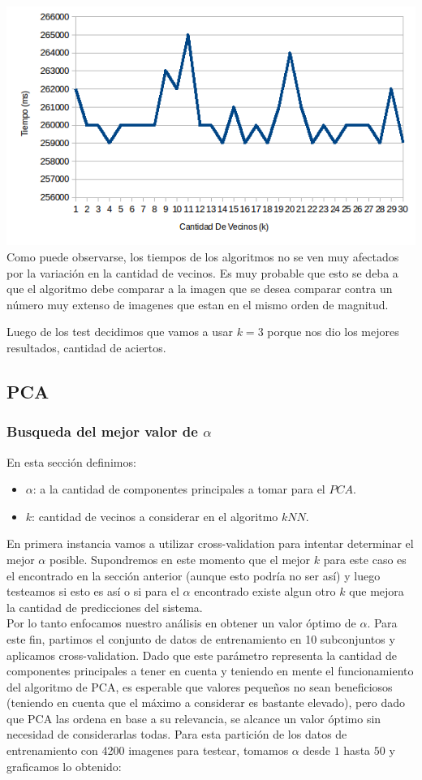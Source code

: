 \includegraphics[scale=0.55]{nuevosResultados/knn/1temp.png}\\

Como puede observarse, los tiempos de los algoritmos no se ven muy afectados por la variación en la cantidad de vecinos. Es muy probable que esto se deba a que el algoritmo debe comparar a la imagen que se desea comparar contra un número muy extenso de imagenes que estan en el mismo orden de magnitud. 
\completar

Luego de los test decidimos que vamos a usar $k=3$ porque nos dio los mejores resultados, cantidad de aciertos.

\subsection{PCA}
\subsubsection{Busqueda del mejor valor de $\alpha$}
En esta sección definimos:
\begin{itemize}
	\item $\alpha$: a la cantidad de componentes principales a tomar para el $PCA$.
	\item $k$: cantidad de vecinos a considerar en el algoritmo $kNN$.
\end{itemize}
En primera instancia vamos a utilizar cross-validation para intentar determinar el mejor $\alpha$ posible. Supondremos en este momento que el mejor $k$ para este caso es el encontrado en la sección anterior (aunque esto podría no ser así) y luego testeamos si esto es así o si para el $\alpha$ encontrado existe algun otro $k$ que mejora la cantidad de predicciones del sistema.
\\
Por lo tanto enfocamos nuestro análisis en obtener un valor óptimo de $\alpha$. Para este fin, partimos el conjunto de datos de entrenamiento en 10 subconjuntos y aplicamos cross-validation. Dado que este parámetro representa la cantidad de componentes principales a tener en cuenta y teniendo en mente el funcionamiento del algoritmo de PCA, es esperable que valores pequeños no sean beneficiosos (teniendo en cuenta que el máximo a considerar es bastante elevado), pero dado que PCA las ordena en base a su relevancia, se alcance un valor óptimo sin necesidad de considerarlas todas. Para esta partición de los datos de entrenamiento con 4200 imagenes para testear, tomamos $\alpha$ desde $1$ hasta $50$ y graficamos lo obtenido:

